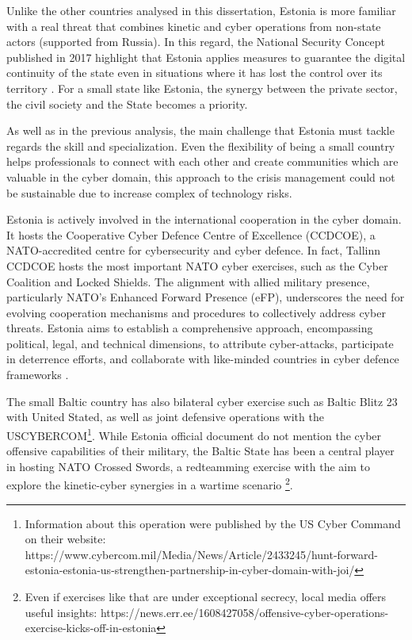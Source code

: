 Unlike the other countries analysed in this dissertation, Estonia is more familiar with a real threat that combines kinetic and cyber operations from non-state actors (supported from Russia). In this regard, the National Security Concept published in 2017 highlight that Estonia applies measures to guarantee the digital continuity of the state even in situations where it has lost the control over its territory \autocite[16]{republicofestonia_2017_national}. For a small state like Estonia, the synergy between the private sector, the civil society and the State becomes a priority.  

As well as in the previous analysis, the main challenge that Estonia must tackle regards the skill and specialization. Even the flexibility of being a small country helps professionals to connect with each other and create communities which are valuable in the cyber domain, this approach to the crisis management could not be sustainable due to increase complex of technology risks.  

Estonia is actively involved in the international cooperation in the cyber domain. It hosts the Cooperative Cyber Defence Centre of Excellence (CCDCOE), a NATO-accredited centre for cybersecurity and cyber defence. In fact, Tallinn CCDCOE hosts the most important NATO cyber exercises, such as the Cyber Coalition and Locked Shields. The alignment with allied military presence, particularly NATO's Enhanced Forward Presence (eFP), underscores the need for evolving cooperation mechanisms and procedures to collectively address cyber threats. Estonia aims to establish a comprehensive approach, encompassing political, legal, and technical dimensions, to attribute cyber-attacks, participate in deterrence efforts, and collaborate with like-minded countries in cyber defence frameworks \autocite{ministryofeconomicaffairsandcommunication_2019_cybersecurity}. 

The small Baltic country has also bilateral cyber exercise such as Baltic Blitz 23 with United Stated, as well as joint defensive operations with the USCYBERCOM\footnote{ Information about this operation were published by the US Cyber Command on their website: https://www.cybercom.mil/Media/News/Article/2433245/hunt-forward-estonia-estonia-us-strengthen-partnership-in-cyber-domain-with-joi/}. While Estonia official document do not mention the cyber offensive capabilities of their military, the Baltic State has been a central player in hosting NATO Crossed Swords, a redteamming exercise with the aim to explore the kinetic-cyber synergies in a wartime scenario \footnote{ Even if exercises like that are under exceptional secrecy, local media offers useful insights: https://news.err.ee/1608427058/offensive-cyber-operations-exercise-kicks-off-in-estonia}. 

